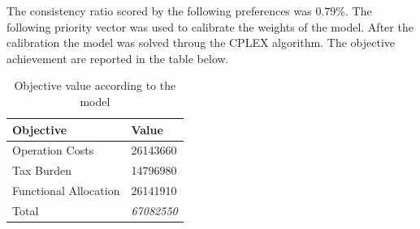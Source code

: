 \documentclass{article}
\begin{document}
The consistency ratio scored by the following preferences was $0.79\%$. The following priority vector was used to calibrate the weights of the model. After the calibration the model was solved throug the CPLEX algorithm. The objective achievement are reported in the table below.
\begin{table}[]
\centering
\begin{tabular}{@{}ll@{}}
\toprule
\textbf{Objective}    & Value         \\ \midrule
Operation Costs       & 26143660     \\
Tax Burden	      & 14796980     \\
Functional Allocation & 26141910     \\
Total                 & \textit{67082550} \\ \bottomrule
\end{tabular}
\caption{Objective value according to the model}
\end{table}


\newpage
\printbibliography
\end{document}
